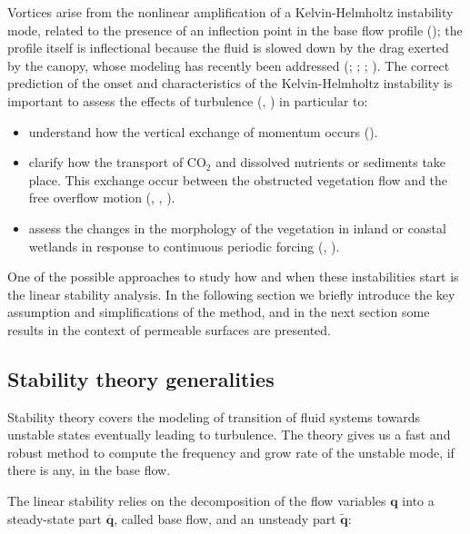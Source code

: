 Vortices arise from the nonlinear amplification of a Kelvin-Helmholtz instability mode, related to the presence of an inflection point in the base flow profile (\citet{asaeda2005morphological}); the profile itself is inflectional because the fluid is slowed down by the drag exerted by the canopy, whose modeling has recently been addressed (\citet{py2004mixing}; \citet{singh2016linear};  \citet{zampogna2016instability}; \citet{tilton2008linear}).
The correct prediction of the onset and characteristics of the Kelvin-Helmholtz instability is important to assess the effects of turbulence (\citet{finnigan2000turbulence}, \citet{jimenez2001turbulent}) in particular to:

\begin{itemize}
	\item understand how the vertical exchange of momentum occurs (\citet{ikeda1996three}).
	\item clarify how the transport of $\text{CO}_2$ and dissolved nutrients or sediments take place. This exchange occur between the
	obstructed vegetation flow and the free overflow motion (\citet{gambi1990flume}, \citet{eckman1987role}, \citet{grizzle1996hydrodynamically}).
	\item assess the changes in the morphology of the vegetation in inland or coastal wetlands in
	response to continuous periodic forcing (\citet{asaeda2005morphological}, \citet{patil2010characteristics}).
\end{itemize}

One of the possible approaches to study how and when these instabilities start is the linear stability analysis. In the following section we briefly introduce the key assumption and simplifications of the method, and in the next section some results in the context of permeable surfaces are presented.


\subsection{Stability theory generalities}

Stability theory covers the modeling of transition of fluid systems towards unstable states eventually leading to turbulence.
The theory gives us a fast and robust method to compute the frequency and grow rate of the unstable mode, if there is any, in the base flow.

The linear stability relies on the decomposition of the flow variables $\mathbf{q}$ into a steady-state part $\overline{\mathbf{q}}$, called base flow, and an unsteady part $\widetilde{\mathbf{q}}$:

